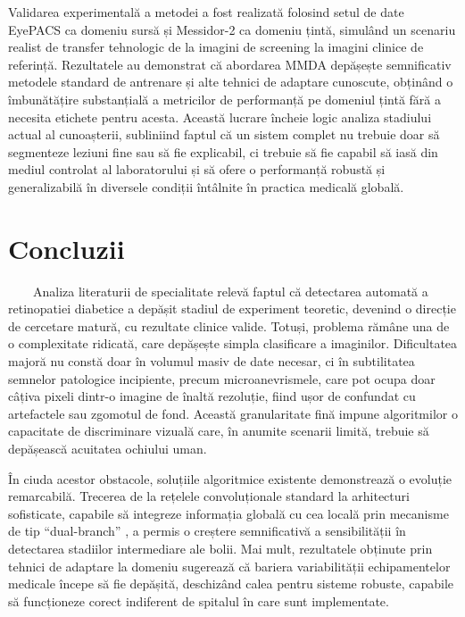 \documentclass[12pt, a4paper, oneside, romanian]{teza-upb}
\begin{document}
Validarea experimentală a metodei a fost realizată folosind setul de date EyePACS \cite{9_chetoui2020explainable} ca domeniu
sursă și Messidor-2 \cite{9_chetoui2020explainable} ca domeniu țintă, simulând un scenariu realist de transfer tehnologic de la imagini
de screening la imagini clinice de referință. Rezultatele au demonstrat că abordarea MMDA depășește
semnificativ metodele standard de antrenare și alte tehnici de adaptare cunoscute, obținând o
îmbunătățire substanțială a metricilor de performanță pe domeniul țintă fără a necesita etichete pentru
acesta. Această lucrare încheie logic analiza stadiului actual al cunoașterii, subliniind faptul că un sistem
complet nu trebuie doar să segmenteze leziuni fine sau să fie explicabil, ci trebuie să fie capabil să iasă
din mediul controlat al laboratorului și să ofere o performanță robustă și generalizabilă în diversele
condiții întâlnite în practica medicală globală.

\section{Concluzii}

\ \ \ \ Analiza literaturii de specialitate relevă faptul că detectarea automată a retinopatiei diabetice a
depășit stadiul de experiment teoretic, devenind o direcție de cercetare matură, cu rezultate clinice
valide. Totuși, problema rămâne una de o complexitate ridicată, care depășește simpla clasificare a
imaginilor. Dificultatea majoră nu constă doar în volumul masiv de date necesar, ci în subtilitatea
semnelor patologice incipiente, precum microanevrismele, care pot ocupa doar câțiva pixeli dintr-o
imagine de înaltă rezoluție, fiind ușor de confundat cu artefactele sau zgomotul de fond. Această
granularitate fină impune algoritmilor o capacitate de discriminare vizuală care, în anumite scenarii
limită, trebuie să depășească acuitatea ochiului uman.
\bigskip

În ciuda acestor obstacole, soluțiile algoritmice existente demonstrează o evoluție remarcabilă.
Trecerea de la rețelele convoluționale standard la arhitecturi sofisticate, capabile să integreze informația
globală cu cea locală prin mecanisme de tip “dual-branch” \cite{11_shakibania2024dual}, a permis o creștere semnificativă a
sensibilității în detectarea stadiilor intermediare ale bolii. Mai mult, rezultatele obținute prin tehnici de
adaptare la domeniu \cite{8_zhang2022multi} sugerează că bariera variabilității echipamentelor medicale începe să fie
depășită, deschizând calea pentru sisteme robuste, capabile să funcționeze corect indiferent de spitalul
în care sunt implementate.
\bigskip
\end{document}
